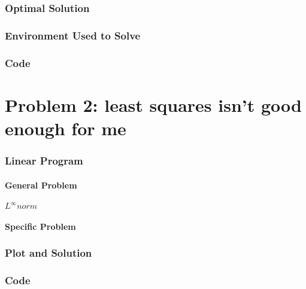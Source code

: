 \documentclass{article}
\begin{document}
\section*{Optimal Solution}

\section*{Environment Used to Solve}

\section*{Code}


\pagebreak


\part*{Problem 2: least squares isn't good enough for me}
\section*{Linear Program}
\subsection*{General Problem}
$L^\infty norm$ \\
\subsection*{Specific Problem}

\section*{Plot and Solution}

\section*{Code}
\end{document}
